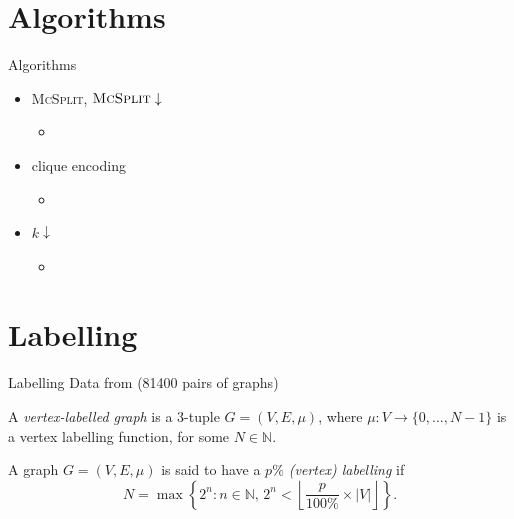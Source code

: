 \documentclass{beamer}
\begin{document}
\section{Algorithms}
\begin{frame}{Algorithms}
  \begin{itemize}
  \item \textsc{McSplit}, $\textsc{McSplit}\downarrow$
    \begin{itemize}
    \item \parencite{DBLP:conf/ijcai/McCreeshPT17}
    \end{itemize}
  \item clique encoding
    \begin{itemize}
    \item \parencite{DBLP:conf/cp/McCreeshNPS16}
    \end{itemize}
  \item $k\downarrow$
    \begin{itemize}
    \item \parencite{DBLP:conf/aaai/HoffmannMR17}
    \end{itemize}
  \end{itemize}
\end{frame}

\section{Labelling}
\begin{frame}{Labelling}
  Data from \cite{foggia2001-2, DBLP:journals/prl/SantoFSV03} (81400 pairs
  of graphs)
  \pause
  \begin{definition}
    A \emph{vertex-labelled graph} is a 3-tuple $G = (V, E, \mu)$, where $\mu
    \colon V \to \{ 0, \dots, N - 1 \}$ is a vertex labelling function, for some
    $N \in \mathbb{N}$.
  \end{definition}
  \pause
  \begin{definition}
    A graph $G = (V, E, \mu)$ is said to have a \emph{$p\%$ (vertex) labelling} if
    \[ N = \max \left\{ 2^n : n \in \mathbb{N},\, 2^n < \left\lfloor \frac{p}{100\%}
          \times |V| \right\rfloor \right\}. \]
  \end{definition}
\end{frame}
\end{document}
